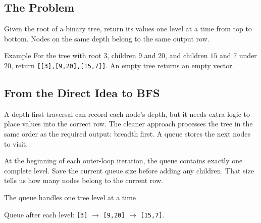 

\subsection{The Problem}
Given the root of a binary tree, return its values one level at a time from
top to bottom. Nodes on the same depth belong to the same output row.

\begin{conceptbox}{Example}
For the tree with root \(3\), children \(9\) and \(20\), and children
\(15\) and \(7\) under \(20\), return
\texttt{[[3],[9,20],[15,7]]}. An empty tree returns an empty vector.
\end{conceptbox}

\subsection{From the Direct Idea to BFS}
A depth-first traversal can record each node's depth, but it needs extra logic
to place values into the correct row. The cleaner approach processes the tree in
the same order as the required output: breadth first. A queue stores the next
nodes to visit.

At the beginning of each outer-loop iteration, the queue contains exactly one
complete level. Save the current queue size before adding any children. That
size tells us how many nodes belong to the current row.

\begin{visualbox}{The queue handles one tree level at a time}
\centering
{}

\smallskip
Queue after each level: \texttt{[3]} $\rightarrow$ \texttt{[9,20]}
$\rightarrow$ \texttt{[15,7]}.
\end{visualbox}


